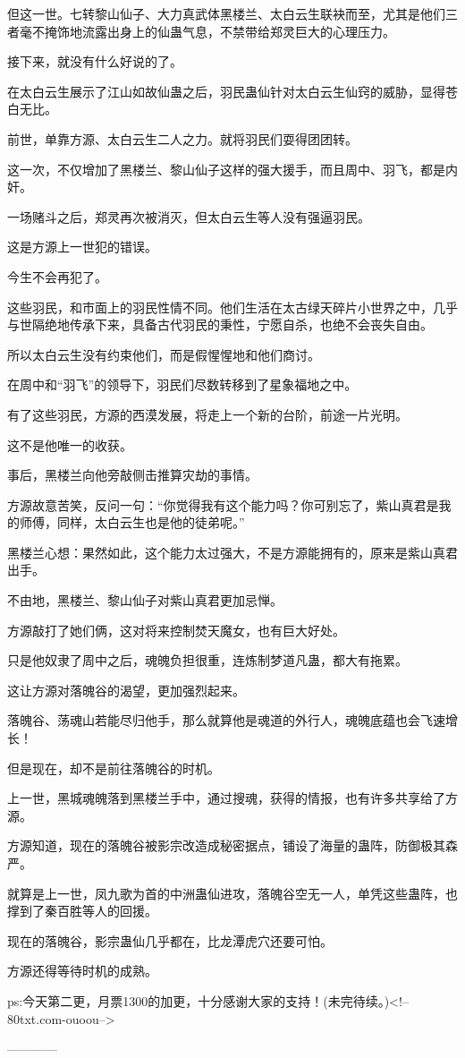 \begin{this_body}
但这一世。七转黎山仙子、大力真武体黑楼兰、太白云生联袂而至，尤其是他们三者毫不掩饰地流露出身上的仙蛊气息，不禁带给郑灵巨大的心理压力。

接下来，就没有什么好说的了。

在太白云生展示了江山如故仙蛊之后，羽民蛊仙针对太白云生仙窍的威胁，显得苍白无比。

前世，单靠方源、太白云生二人之力。就将羽民们耍得团团转。

这一次，不仅增加了黑楼兰、黎山仙子这样的强大援手，而且周中、羽飞，都是内奸。

一场赌斗之后，郑灵再次被消灭，但太白云生等人没有强逼羽民。

这是方源上一世犯的错误。

今生不会再犯了。

这些羽民，和市面上的羽民性情不同。他们生活在太古绿天碎片小世界之中，几乎与世隔绝地传承下来，具备古代羽民的秉性，宁愿自杀，也绝不会丧失自由。

所以太白云生没有约束他们，而是假惺惺地和他们商讨。

在周中和“羽飞”的领导下，羽民们尽数转移到了星象福地之中。

有了这些羽民，方源的西漠发展，将走上一个新的台阶，前途一片光明。

这不是他唯一的收获。

事后，黑楼兰向他旁敲侧击推算灾劫的事情。

方源故意苦笑，反问一句：“你觉得我有这个能力吗？你可别忘了，紫山真君是我的师傅，同样，太白云生也是他的徒弟呢。”

黑楼兰心想：果然如此，这个能力太过强大，不是方源能拥有的，原来是紫山真君出手。

不由地，黑楼兰、黎山仙子对紫山真君更加忌惮。

方源敲打了她们俩，这对将来控制焚天魔女，也有巨大好处。

只是他奴隶了周中之后，魂魄负担很重，连炼制梦道凡蛊，都大有拖累。

这让方源对落魄谷的渴望，更加强烈起来。

落魄谷、荡魂山若能尽归他手，那么就算他是魂道的外行人，魂魄底蕴也会飞速增长！

但是现在，却不是前往落魄谷的时机。

上一世，黑城魂魄落到黑楼兰手中，通过搜魂，获得的情报，也有许多共享给了方源。

方源知道，现在的落魄谷被影宗改造成秘密据点，铺设了海量的蛊阵，防御极其森严。

就算是上一世，凤九歌为首的中洲蛊仙进攻，落魄谷空无一人，单凭这些蛊阵，也撑到了秦百胜等人的回援。

现在的落魄谷，影宗蛊仙几乎都在，比龙潭虎穴还要可怕。

方源还得等待时机的成熟。

ps:今天第二更，月票1300的加更，十分感谢大家的支持！(未完待续。)<!--80txt.com-ouoou-->

------------

\end{this_body}

